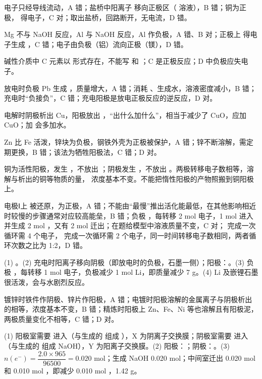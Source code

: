 \begin{jiexilist}
\item {}电子只经导线流动，A 错；盐桥中阳离子  移向正极区（ 溶液），B 错；铜为正极， 得电子，C 对；取出盐桥，回路断开，无电流，D 错。
\item {}Mg 不与 NaOH 反应，Al 与 NaOH 反应，Al 作负极，A 错、B 对；正极上  得电子生成 ，C 错；电子由负极（铝）流向正极（镁），D 错。
\item {}碱性介质中 C 元素以  形式存在，不能写  和 ；C 是正极反应；D 中负极应失电子。
\item {}放电时负极 Pb 生成 ，质量增大，A 错；消耗 、生成水，溶液密度减小，B 错；充电时“负接负”，C 错；充电阳极是放电正极反应的逆反应，D 对。
\item {}电解时阴极析出 Cu，阳极放出 ，“出什么加什么”，相当于减少了 CuO，应加 CuO；加  会多加水。
\item {}Zn 比 Fe 活泼，锌块为负极，钢铁外壳为正极被保护，A 错；锌不断溶解，需定期更换，B 错；该法为牺牲阳极法，C 错；D 对。
\item {}铜为活性阳极，发生 ，不放出 ；阴极发生 ，不放出 。两极转移电子数相等，溶解与析出的铜等物质的量， 浓度基本不变。不能把惰性阳极的产物照搬到铜阳极上。
\item {}电极Ⅰ上  被还原，为正极，A 错；不能由“最慢”推出活化能最低，在其他影响相近时较慢的步骤通常对应较高能垒，B 错；负极 ，每转移 2 mol 电子，1 mol  进入并生成 2 mol ，又有 2 mol  迁出；在题给模型中溶液质量不变，C 对； 完成一次循环需 4 个电子， 完成一次循环需 2 个电子，同一时间转移电子数相同，两者循环次数之比为 1:2，D 错。
\item (1) 。(2) 充电时阳离子移向阴极（即放电时的负极，石墨一侧）；阳极：。(3) 负极 ，每转移 1 mol 电子，负极减少 1 mol Li，即质量减少 7 g。(4) Li 及嵌锂石墨很活泼，会与水剧烈反应。
\item {}镀锌时铁件作阴极、锌片作阳极，A 错；电镀时阳极溶解的金属离子与阴极析出的相等，浓度基本不变，B 错；精炼时阳极上 Zn、Fe、Ni 等也溶解且有阳极泥，两极质量变化不相等，C 错；D 对。
\item (1) 阳极室需要  进入（与生成的  组成 ），X 为阴离子交换膜；阴极室需要  进入（与生成的  组成 NaOH），Y 为阳离子交换膜。(2) 阳极：；阴极：。(3) $n(e^-)=\dfrac{2.0\times965}{96500}=0.020$ mol；生成 NaOH 0.020 mol；中间室迁出 0.020 mol  和 0.010 mol ，即减少 0.010 mol ，1.42 g。

\end{jiexilist}
